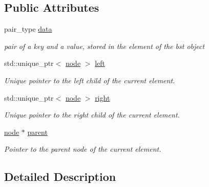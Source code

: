 \subsection*{Public Attributes}
\begin{DoxyCompactItemize}
\item 
\mbox{\label{structbst_1_1node_a1b32edfc5b4f79da6a57afb7e1fcdfb4}} 
pair\+\_\+type \hyperlink{structbst_1_1node_a1b32edfc5b4f79da6a57afb7e1fcdfb4}{data}
\begin{DoxyCompactList}\small\item\em pair of a key and a value, stored in the element of the bst object \end{DoxyCompactList}\item 
\mbox{\label{structbst_1_1node_abd1e68c0c567368df14b07cc6b78e1b7}} 
std\+::unique\+\_\+ptr$<$ \hyperlink{structbst_1_1node}{node} $>$ \hyperlink{structbst_1_1node_abd1e68c0c567368df14b07cc6b78e1b7}{left}
\begin{DoxyCompactList}\small\item\em Unique pointer to the left child of the current element. \end{DoxyCompactList}\item 
\mbox{\label{structbst_1_1node_acd71e61ed51c04692f62960882e7133a}} 
std\+::unique\+\_\+ptr$<$ \hyperlink{structbst_1_1node}{node} $>$ \hyperlink{structbst_1_1node_acd71e61ed51c04692f62960882e7133a}{right}
\begin{DoxyCompactList}\small\item\em Unique pointer to the right child of the current element. \end{DoxyCompactList}\item 
\mbox{\label{structbst_1_1node_a07f87fe63f979da463e77775bf8fc972}} 
\hyperlink{structbst_1_1node}{node} $\ast$ \hyperlink{structbst_1_1node_a07f87fe63f979da463e77775bf8fc972}{parent}
\begin{DoxyCompactList}\small\item\em Pointer to the parent node of the current element. \end{DoxyCompactList}\end{DoxyCompactItemize}


\subsection{Detailed Description}
